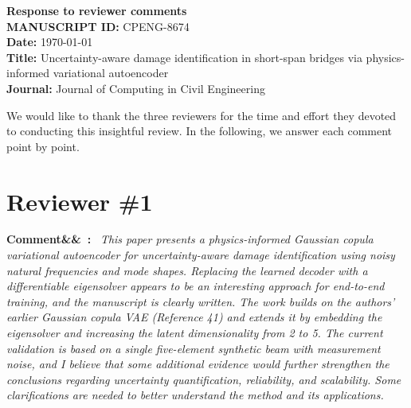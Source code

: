 \documentclass[11pt]{article}
\newenvironment{rcomment}[1]{\par\bigskip\noindent\textbf{Comment\ifx&#1&\else\ #1\fi:}\ \itshape}{\par}
\begin{document}
\begin{center}
{\Large\bfseries Response to reviewer comments}\\[8pt]
\textbf{MANUSCRIPT ID:} CPENG-8674\\
\textbf{Date:} \today\\
\textbf{Title:} Uncertainty-aware damage identification in short-span bridges via physics-informed variational
autoencoder\\
\textbf{Journal:} Journal of Computing in Civil Engineering
\end{center}

%
We would like to thank the three reviewers for the time and effort they devoted to conducting this insightful review.
In the following, we answer each comment point by point. 


%

\section{Reviewer \#1}

\begin{rcomment}{}
This paper presents a physics-informed Gaussian copula variational autoencoder for uncertainty-aware damage
identification using noisy natural frequencies and mode shapes. Replacing the learned decoder with a differentiable
eigensolver appears to be an interesting approach for end-to-end training, and the manuscript is clearly written. The work
builds on the authors' earlier Gaussian copula VAE (Reference 41) and extends it by embedding the eigensolver and
increasing the latent dimensionality from 2 to 5. The current validation is based on a single five-element synthetic
beam with measurement noise, and I believe that some additional evidence would further strengthen the conclusions
regarding uncertainty quantification, reliability, and scalability. Some clarifications are needed to better understand
the method and its applications.
\end{rcomment}
\end{document}
